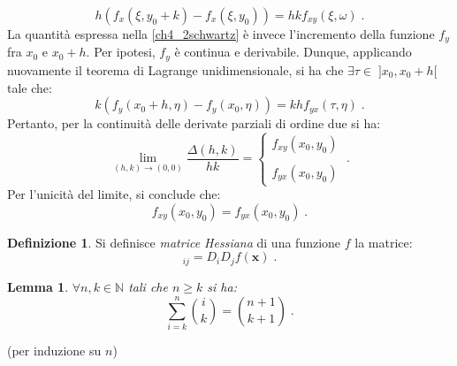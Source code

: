 \documentclass[a4paper,12pt]{report}
\theoremstyle{plain}
\newtheorem{lem}{Lemma}[section]
\theoremstyle{definition}
\newtheorem{defn}{Definizione}[section]
\theoremstyle{remark}
\numberwithin{equation}{section}
\begin{document}
\begin{equation}
h(f_x(\xi,y_0+k)-f_x(\xi,y_0))=hkf_{xy}(\xi,\omega)\;.
\end{equation}
La quantità espressa nella \eqref{ch4_2schwartz} è invece l'incremento della funzione $f_y$ fra $x_0$ e $x_0+h$. Per ipotesi, $f_y$ è continua e derivabile. Dunque, applicando nuovamente il teorema di Lagrange unidimensionale, si ha che $\exists \tau \in\; ]x_0,x_0+h[$ tale che:
\begin{equation}
k(f_y(x_0+h,\eta)-f_y(x_0,\eta))=kh f_{yx}(\tau,\eta)\;.
\end{equation}
Pertanto, per la continuità delle derivate parziali di ordine due si ha:
\begin{equation}
\lim_{(h,k)\to(0,0)} \frac{\Delta(h,k)}{hk}=\begin{cases}
                                      f_{xy}(x_0,y_0) \\
                                      \\
f_{yx}(x_0,y_0)
                                     \end{cases}\;.
\end{equation}
Per l'unicità del limite, si conclude che:
\begin{equation}
f_{xy}(x_0,y_0)=f_{yx}(x_0,y_0)\;.
\end{equation}
\endproof
\begin{defn} Si definisce \textit{matrice Hessiana} di una funzione $f$ la matrice:
\begin{equation}
[H_f(\mathbf{x})]_{ij}=D_iD_jf(\mathbf{x})\;.
\end{equation}
\end{defn}
\begin{lem} $\forall n,k \in \mathbb{N}$ tali che $n \ge k$ si ha:
\begin{equation}
\sum_{i=k}^n \binom{i}{k}=\binom{n+1}{k+1}\;.
\end{equation}
\end{lem}
\proof (per induzione su $n$) \\
\end{document}
